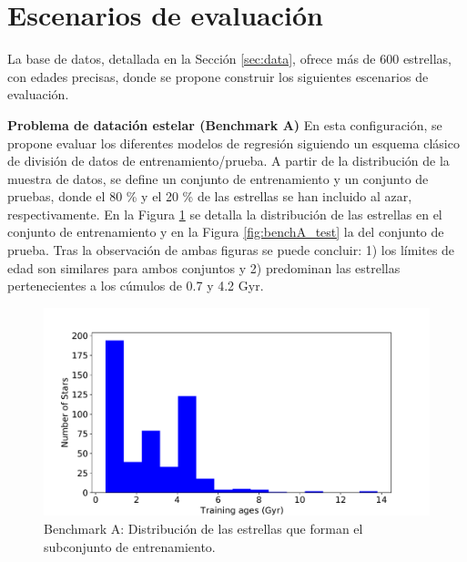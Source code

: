 \section{Escenarios de evaluación}
\label{sec:benchmark}

La base de datos, detallada en la Sección \ref{sec:data}, ofrece más de 600 estrellas, con edades precisas, donde se propone construir los siguientes escenarios de evaluación.

\vspace{0.5cm}

\textbf{Problema de datación estelar (Benchmark A)} {} En esta configuración, se propone evaluar los diferentes modelos de regresión siguiendo un esquema clásico de división de datos de entrenamiento/prueba. A partir de la distribución de la muestra de datos, se define un conjunto de entrenamiento y un conjunto de pruebas, donde el  80 \% y el 20 \% de las estrellas se han incluido al azar, respectivamente. En la Figura \ref{fig:benchA_train} se detalla la distribución de las estrellas en el conjunto de entrenamiento y en la Figura \ref{fig:benchA_test} la del conjunto de prueba. Tras la observación de ambas figuras se puede concluir: 1) los límites de edad son similares para ambos conjuntos y 2) predominan las estrellas pertenecientes a los cúmulos de 0.7 y 4.2 Gyr. 

\begin{figure}[H]
\begin{center}
 \includegraphics[width=0.8\linewidth]{Figuras/Experimentos/B_A_training.pdf}
\end{center}
\caption{Benchmark A: Distribución de las estrellas que forman el subconjunto de entrenamiento.}
 \label{fig:benchA_train}
\end{figure}

